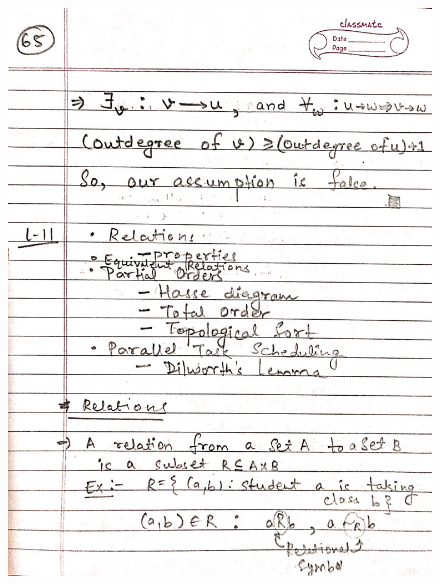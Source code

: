 \begin{figure}[H]
    \centering
    \includegraphics[scale=0.25]{"./MIT 6.042J/MIT_6042J_065"}
\end{figure}
\newpage
